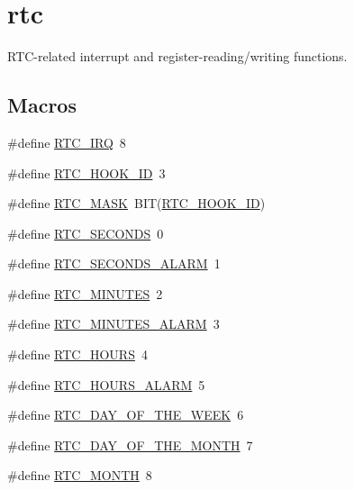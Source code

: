 \hypertarget{group__rtc}{}\section{rtc}
\label{group__rtc}


R\+T\+C-\/related interrupt and register-\/reading/writing functions.  


\subsection*{Macros}
\begin{DoxyCompactItemize}
\item 
\#define \hyperlink{group__rtc_ga4e22feb6ffbc1cda32fadff5c740dc51}{R\+T\+C\+\_\+\+I\+RQ}~8
\item 
\#define \hyperlink{group__rtc_gac93f7885d306a82906ee65bdbf0db65d}{R\+T\+C\+\_\+\+H\+O\+O\+K\+\_\+\+ID}~3
\item 
\#define \hyperlink{group__rtc_gab54f2d18b47b47a59f718e16099446e8}{R\+T\+C\+\_\+\+M\+A\+SK}~B\+IT(\hyperlink{group__rtc_gac93f7885d306a82906ee65bdbf0db65d}{R\+T\+C\+\_\+\+H\+O\+O\+K\+\_\+\+ID})
\item 
\#define \hyperlink{group__rtc_ga43f6540c6d3a78b930f9adad56cf7fac}{R\+T\+C\+\_\+\+S\+E\+C\+O\+N\+DS}~0
\item 
\#define \hyperlink{group__rtc_gaba1a00fd8dcaa066bbb9cecacb4dd04b}{R\+T\+C\+\_\+\+S\+E\+C\+O\+N\+D\+S\+\_\+\+A\+L\+A\+RM}~1
\item 
\#define \hyperlink{group__rtc_gaabc0725ac27ea93c913a2a4d7cd51ac7}{R\+T\+C\+\_\+\+M\+I\+N\+U\+T\+ES}~2
\item 
\#define \hyperlink{group__rtc_ga3354ceb0b3dc74b2ff1123ecd0b7c043}{R\+T\+C\+\_\+\+M\+I\+N\+U\+T\+E\+S\+\_\+\+A\+L\+A\+RM}~3
\item 
\#define \hyperlink{group__rtc_ga4d74cdb9a956c4f1783ad5aff00dc2b8}{R\+T\+C\+\_\+\+H\+O\+U\+RS}~4
\item 
\#define \hyperlink{group__rtc_ga736eabe8fe923b38d85437697f37ba35}{R\+T\+C\+\_\+\+H\+O\+U\+R\+S\+\_\+\+A\+L\+A\+RM}~5
\item 
\#define \hyperlink{group__rtc_ga7ed5faace1f720b524bfb2ef119a7123}{R\+T\+C\+\_\+\+D\+A\+Y\+\_\+\+O\+F\+\_\+\+T\+H\+E\+\_\+\+W\+E\+EK}~6
\item 
\#define \hyperlink{group__rtc_ga8d7ce94679a93c7844b73de578abb9c9}{R\+T\+C\+\_\+\+D\+A\+Y\+\_\+\+O\+F\+\_\+\+T\+H\+E\+\_\+\+M\+O\+N\+TH}~7
\item 
\#define \hyperlink{group__rtc_gabda0c877ee1a02b8351c0cfe72838088}{R\+T\+C\+\_\+\+M\+O\+N\+TH}~8

\end{DoxyCompactItemize}
